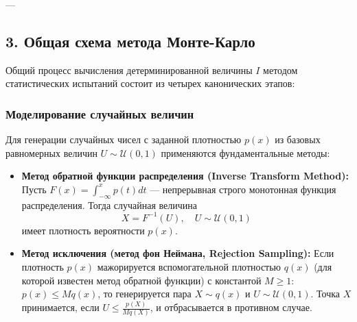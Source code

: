 \documentclass[11pt,a4paper]{article}
\begin{document}
---

\subsection{3. Общая схема метода Монте-Карло}

Общий процесс вычисления детерминированной величины $I$ методом статистических испытаний состоит из четырех канонических этапов:

\begin{figure}[h!]
\centering
{}
\end{figure}

\subsubsection{Моделирование случайных величин}
Для генерации случайных чисел с заданной плотностью $p(x)$ из базовых равномерных величин $U \sim \mathcal{U}(0,1)$ применяются фундаментальные методы:
\begin{itemize}
    \item \textbf{Метод обратной функции распределения (Inverse Transform Method):}
    Пусть $F(x) = \int_{-\infty}^x p(t) dt$ --- непрерывная строго монотонная функция распределения. Тогда случайная величина
    \begin{equation}
        X = F^{-1}(U), \quad U \sim \mathcal{U}(0,1)
    \end{equation}
    имеет плотность вероятности $p(x)$.
    
    \item \textbf{Метод исключения (метод фон Неймана, Rejection Sampling):}
    Если плотность $p(x)$ мажорируется вспомогательной плотностью $q(x)$ (для которой известен метод обратной функции) с константой $M \ge 1$: $p(x) \le M q(x)$, то генерируется пара $X \sim q(x)$ и $U \sim \mathcal{U}(0,1)$. Точка $X$ принимается, если $U \le \frac{p(X)}{M q(X)}$, и отбрасывается в противном случае.
\end{itemize}
\end{document}
